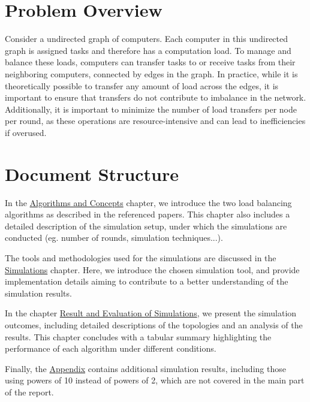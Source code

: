 \section{Problem Overview}
Consider a undirected graph of computers. Each computer in this undirected graph is assigned tasks and therefore has a computation load. To manage and balance these loads, computers can transfer tasks to or receive tasks from their neighboring computers, connected by edges in the graph.
In practice, while it is theoretically possible to transfer any amount of load across the edges, it is important to ensure that transfers do not contribute to imbalance in the network. Additionally, it is important to minimize the number of load transfers per node per round, as these operations are resource-intensive and can lead to inefficiencies if overused.

\section{Document Structure}
In the \hyperref[chap:background]{Algorithms and Concepts} chapter, we introduce the two load balancing algorithms as described in the referenced papers. This chapter also includes a detailed description of the simulation setup, under which the simulations are conducted (eg. number of rounds, simulation techniques...).

The tools and methodologies used for the simulations are discussed in the \hyperref[chap:simulations]{Simulations} chapter. Here, we introduce the chosen simulation tool, and provide implementation details aiming to contribute to a better understanding of the simulation results.

In the chapter \hyperref[chap:results]{Result and Evaluation of Simulations}, we present the simulation outcomes, including detailed descriptions of the topologies and an analysis of the results. This chapter concludes with a tabular summary highlighting the performance of each algorithm under different conditions.

Finally, the \hyperref[chap:appendix]{Appendix} contains additional simulation results, including those using powers of 10 instead of powers of 2, which are not covered in the main part of the report.
